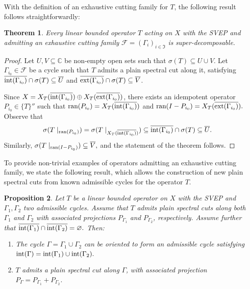 \documentclass[11pt]{amsart}
\newtheorem{theorem}{Theorem}[section]
\newtheorem{proposition}[theorem]{Proposition}
\theoremstyle{definition}
\theoremstyle{remark}
\numberwithin{equation}{section}
\newcommand{\ran}{\textnormal{ran}}
\newcommand{\C}{\mathbb{C}}
\newcommand{\biconm}[1]{{\{#1\}''}}
\newcommand{\inte}{\textnormal{int}}
\newcommand{\exte}{\textnormal{ext}}
\begin{document}
With the definition of an exhaustive cutting family for $T$, the following result follows straightforwardly:

\begin{theorem}\label{teorema super-decomposable}
Every linear bounded operator $T$ acting on $X$ with the SVEP and admitting an exhaustive cutting family $\mathcal{F}= (\Gamma_i)_{i\in\mathfrak{I}}$ is super-decomposable.
\end{theorem}

\smallskip

\begin{proof}  Let $U,V\subseteq  \C$ be non-empty open sets such that $\sigma(T)\subseteq  U\cup V$. Let $\Gamma_{i_0}\in \mathcal{F}$ be a cycle such that $T$ admits a plain spectral cut along it, satisfying  $\overline{\inte(\Gamma_{i_0})}\cap \sigma(T) \subseteq  \overline{U}$ and $\overline{\exte(\Gamma_{i_0})}\cap \sigma(T) \subseteq  \overline{V}$.

Since $X=X_T(\overline{\inte(\Gamma_{i_0})})\oplus X_T(\overline{\exte(\Gamma_{i_0})})$, there exists an idempotent operator $P_{{i_0}} \in \biconm{T}$ such that $\ran(P_{{i_0}}) =X_T(\overline{\inte(\Gamma_{i_0})})$ and $\ran(I-P_{{i_0}}) =X_T(\overline{\exte(\Gamma_{i_0})}).$ Observe that
$$\sigma(T\mid_{\ran(P_{{i_0}})}) = \sigma(T\mid_{X_T(\overline{\inte(\Gamma_{i_0})})})   \subseteq   \overline{\inte(\Gamma_{i_0})}\cap \sigma(T) \subseteq   \overline{U}.$$
 Similarly, $\sigma(T\mid_{\ran(I-P_{{i_0}})}) \subseteq  \overline{V},$ and the statement of the theorem follows.
\end{proof}

To provide non-trivial examples of operators admitting an exhaustive cutting family, we state the following result, which allows the construction of new plain spectral cuts from known admissible cycles for the operator $T$.


\begin{proposition}\label{proposicion union curvas}
Let $T$ be a linear bounded operator on $X$ with the SVEP and $\Gamma_1,\Gamma_2$ two admissible cycles. Assume that $T$ admits plain spectral cuts along both $\Gamma_1$ and $\Gamma_2$ with associated projections $P_{\Gamma_1}$ and $P_{\Gamma_2}$, respectively. Assume further that $\overline{\inte(\Gamma_1)}\cap \overline{\inte(\Gamma_2)}=\varnothing.$ Then:
    \begin{enumerate}
        \item [(i)] The cycle $\Gamma = \Gamma_1\cup \Gamma_2$ can be oriented to form an admissible cycle satisfying $\inte(\Gamma) = \inte(\Gamma_1)\cup \inte(\Gamma_2).$
        \item [(ii)] $T$ admits a plain spectral cut along $\Gamma$, with associated projection $P_\Gamma = P_{\Gamma_1}+P_{\Gamma_2}$.
    \end{enumerate}
\end{proposition}
\end{document}
